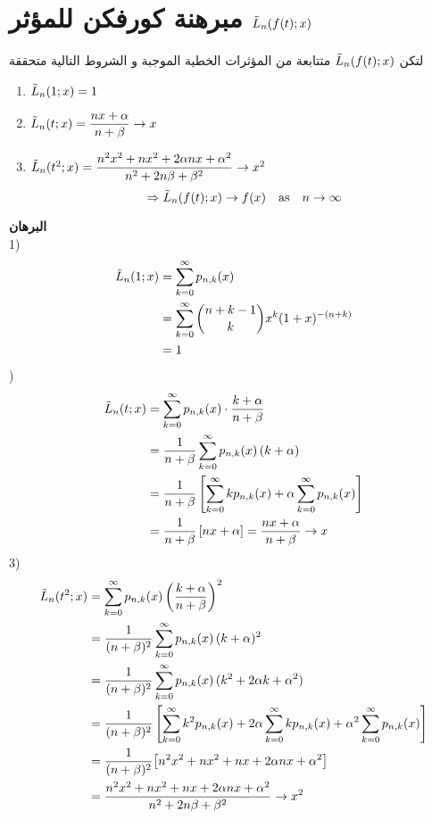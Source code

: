 \section{مبرهنة كورفكن للمؤثر $\tilde{L}_n(f(t); x)$}
لتكن $\tilde{L}_n(f(t);x)$ متتابعة من المؤثرات الخطية الموجبة  و الشروط التالية متحققة
\begin{english}
	\begin{enumerate}
		\item $\tilde{L}_n(1;x)=1$
		\item $\tilde{L}_n(t;x) = \dfrac{nx + \alpha}{n + \beta} \to x$
		\item $\tilde{L}_n(t^2;x) = \dfrac{n^2x^2 + nx^2 + 2\alpha n x + \alpha^2}{n^2 + 2n\beta+ \beta^2} \to x^2$
		\[
		\Rightarrow\tilde{L}_n(f(t);x) \to f(x) \quad\text{as}\quad n\to \infty
		\]
	\end{enumerate}
\end{english}
\noindent
\textbf{البرهان}\\
1)
\begin{align*}
	\tilde{L}_n(1; x) &= \sum_{k=0}^{\infty} p_{n,k}(x)\\
&= \sum_{k=0}^{\infty}\binom{n+k-1}{k} x^k (1+x)^{-(n+k)} \\
&=1
\end{align*}
\newpage
{})
\begin{align*}
	\tilde{L}_n(t; x) &= \sum_{k=0}^{\infty} p_{n, k}(x) \cdot \frac{k+\alpha}{n+\beta}\\
	&= \frac{1}{n+\beta} \sum_{k=0}^{\infty} p_{n, k}(x)\, (k+\alpha)\\
	&= \frac{1}{n+\beta} \left[\sum_{k=0}^{\infty}k p_{n, k}(x)  +\alpha \sum_{k=0}^{\infty} p_{n, k}(x) \right]\\
	&= \frac{1}{n+\beta} \left[nx + \alpha\right] = \frac{nx + \alpha}{n + \beta}\to x
\end{align*}
3)
\begin{align*}
	\tilde{L}_n(t^2; x) &= \sum_{k=0}^{\infty} p_{n, k}(x)  \left(\frac{k+\alpha}{n + \beta}\right)^2\\
	&= \frac{1}{(n+\beta)^2} \sum_{k=0}^{\infty} p_{n, k}(x) \,(k+\alpha)^2\\
	&= \frac{1}{(n+\beta)^2} \sum_{k=0}^{\infty} p_{n, k}(x) \,(k^2+2\alpha k + \alpha^2)\\
	&= \frac{1}{(n+\beta)^2} \left[\sum_{k=0}^{\infty}k^2 p_{n, k}(x)  +2\alpha \sum_{k=0}^{\infty} kp_{n, k}(x)  +\alpha^2 \sum_{k=0}^{\infty} p_{n, k}(x) \right]\\
	&= \frac{1}{(n+\beta)^2} \big[n^2x^2 + nx^2 + nx + 2\alpha n x+ \alpha^2\big]\\
	&= \frac{n^2x^2 + nx^2 + nx + 2\alpha n x+ \alpha^2}{n^2 + 2n\beta + \beta^2} \to x^2
\end{align*}






